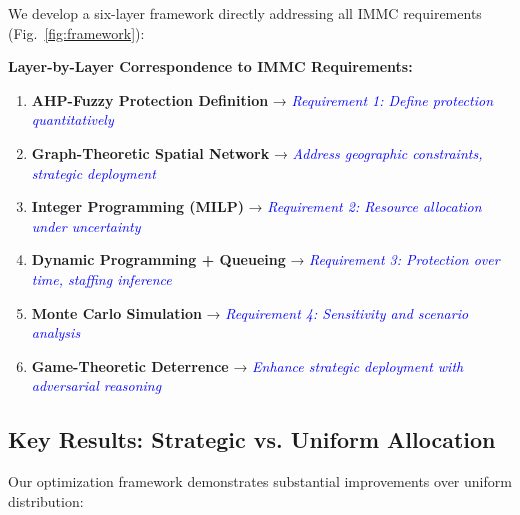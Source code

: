 We develop a six-layer framework directly addressing all IMMC requirements (Fig.~\ref{fig:framework}):



\textbf{Layer-by-Layer Correspondence to IMMC Requirements:}
\begin{enumerate}
    \item \textbf{AHP-Fuzzy Protection Definition} → \textcolor{blue}{\textit{Requirement 1: Define protection quantitatively}}
    \item \textbf{Graph-Theoretic Spatial Network} → \textcolor{blue}{\textit{Address geographic constraints, strategic deployment}}
    \item \textbf{Integer Programming (MILP)} → \textcolor{blue}{\textit{Requirement 2: Resource allocation under uncertainty}}
    \item \textbf{Dynamic Programming + Queueing} → \textcolor{blue}{\textit{Requirement 3: Protection over time, staffing inference}}
    \item \textbf{Monte Carlo Simulation} → \textcolor{blue}{\textit{Requirement 4: Sensitivity and scenario analysis}}
    \item \textbf{Game-Theoretic Deterrence} → \textcolor{blue}{\textit{Enhance strategic deployment with adversarial reasoning}}
\end{enumerate}

\subsection{Key Results: Strategic vs. Uniform Allocation}

Our optimization framework demonstrates substantial improvements over uniform distribution:

\begin{table}[h]
\centering
\small
{}
\end{table}

